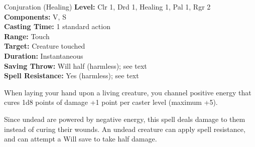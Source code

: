 {Conjuration (Healing)}
{
	\textbf{Level:}
	Clr 1, Drd 1, Healing 1, Pal 1, Rgr 2\\
	\textbf{Components:}
	V, S\\
	\textbf{Casting Time:}
	1 standard action\\
	\textbf{Range:}
	Touch\\
	\textbf{Target:}
	Creature touched\\
	\textbf{Duration:}
	Instantaneous\\
	\textbf{Saving Throw:}
	Will half (harmless); see text\\
	\textbf{Spell Resistance:}
	Yes (harmless); see text\\
}
{
	When laying your hand upon a living creature, you channel positive energy that cures 1d8 points of damage +1 point per caster level (maximum +5).

	Since undead are powered by negative energy, this spell deals damage to them instead of curing their wounds. An undead creature can apply spell resistance, and can attempt a Will save to take half damage.

}
